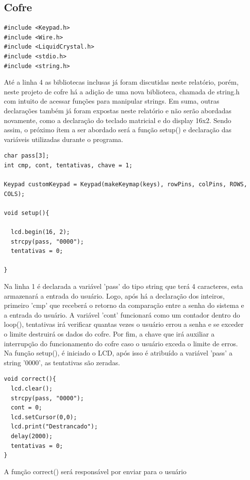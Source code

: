 \documentclass[conference]{IEEEtran}
\begin{document}
    \subsection{Cofre}
        \begin{lstlisting}
#include <Keypad.h>
#include <Wire.h>
#include <LiquidCrystal.h>
#include <stdio.h>
#include <string.h>
        \end{lstlisting}
        Até a linha 4 as bibliotecas inclusas já foram discutidas
        neste relatório, porém, neste projeto de cofre há a adição
        de uma nova biblioteca, chamada de string.h com intuito
        de acessar funções para manipular strings. Em suma, outras
        declarações também já foram expostas neste relatório e não
        serão abordadas novamente, como a declaração do teclado
        matricial e do display 16x2. Sendo assim, o próximo ítem a
        ser abordado será a função setup() e declaração das variáveis
        utilizadas durante o programa.
        \begin{lstlisting}
char pass[3];
int cmp, cont, tentativas, chave = 1;

Keypad customKeypad = Keypad(makeKeymap(keys), rowPins, colPins, ROWS, COLS);

void setup(){
  
  lcd.begin(16, 2);
  strcpy(pass, "0000");
  tentativas = 0;
  
}
        \end{lstlisting}
        Na linha 1 é declarada a variável ’pass’ do tipo string que terá
        4 caracteres, esta armazenará a entrada do usuário. Logo, após
        há a declaração dos inteiros, primeiro ’cmp’ que receberá o
        retorno da comparação entre a senha do sistema e a entrada do
        usuário. A variável ’cont’ funcionará como um contador dentro
        do loop(), tentativas irá verificar quantas vezes o usuário errou
        a senha e se exceder o limite destruirá os dados do cofre. Por
        fim, a chave que irá auxiliar a interrupção do funcionamento
        do cofre caso o usuário exceda o limite de erros. Na função
        setup(), é iniciado o LCD, após isso é atribuído a variável
        ’pass’ a string ’0000’, as tentativas são zeradas.
        \begin{lstlisting}
void correct(){
  lcd.clear();
  strcpy(pass, "0000");
  cont = 0;
  lcd.setCursor(0,0);
  lcd.print("Destrancado");
  delay(2000);
  tentativas = 0;
}
        \end{lstlisting}
        A função correct() será responsável por enviar para o usuário
\end{document}
